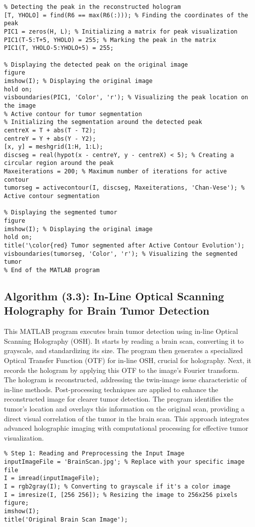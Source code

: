 \begin{appendices}
\begin{lstlisting}
% Detecting the peak in the reconstructed hologram
[T, YHOLO] = find(R6 == max(R6(:))); % Finding the coordinates of the peak
PIC1 = zeros(H, L); % Initializing a matrix for peak visualization
PIC1(T-5:T+5, YHOLO) = 255; % Marking the peak in the matrix
PIC1(T, YHOLO-5:YHOLO+5) = 255;

% Displaying the detected peak on the original image
figure
imshow(I); % Displaying the original image
hold on;
visboundaries(PIC1, 'Color', 'r'); % Visualizing the peak location on the image
% Active contour for tumor segmentation
% Initializing the segmentation around the detected peak
centreX = T + abs(T - T2);
centreY = Y + abs(Y - Y2);
[x, y] = meshgrid(1:H, 1:L);
discseg = real(hypot(x - centreY, y - centreX) < 5); % Creating a circular region around the peak
Maxeiterations = 200; % Maximum number of iterations for active contour
tumorseg = activecontour(I, discseg, Maxeiterations, 'Chan-Vese'); % Active contour segmentation

% Displaying the segmented tumor
figure
imshow(I); % Displaying the original image
hold on;
title('\color{red} Tumor segmented after Active Contour Evolution');
visboundaries(tumorseg, 'Color', 'r'); % Visualizing the segmented tumor
% End of the MATLAB program
\end{lstlisting}

\subsection{Algorithm (3.3): In-Line Optical Scanning Holography for Brain Tumor Detection}
This MATLAB program executes brain tumor detection using in-line Optical Scanning Holography (OSH). It starts by reading a brain scan, converting it to grayscale, and standardizing its size. The program then generates a specialized Optical Transfer Function (OTF) for in-line OSH, crucial for holography. Next, it records the hologram by applying this OTF to the image's Fourier transform. The hologram is reconstructed, addressing the twin-image issue characteristic of in-line methods. Post-processing techniques are applied to enhance the reconstructed image for clearer tumor detection. The program identifies the tumor's location and overlays this information on the original scan, providing a direct visual correlation of the tumor in the brain scan. This approach integrates advanced holographic imaging with computational processing for effective tumor visualization.
\\
\begin{lstlisting}
% Step 1: Reading and Preprocessing the Input Image
inputImageFile = 'BrainScan.jpg'; % Replace with your specific image file
I = imread(inputImageFile);
I = rgb2gray(I); % Converting to grayscale if it's a color image
I = imresize(I, [256 256]); % Resizing the image to 256x256 pixels
figure;
imshow(I);
title('Original Brain Scan Image');


\end{lstlisting}
\end{appendices}
